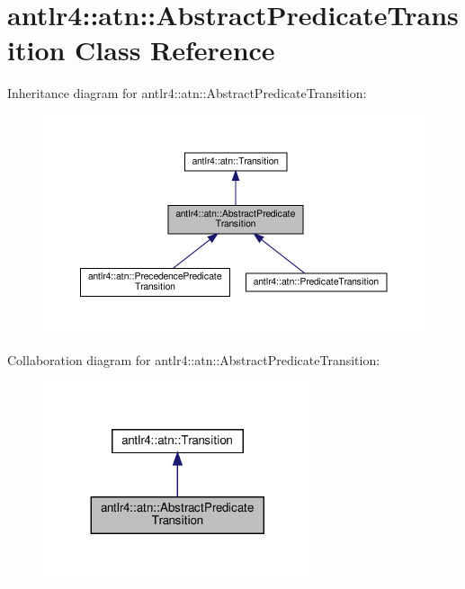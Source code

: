 \hypertarget{classantlr4_1_1atn_1_1AbstractPredicateTransition}{}\section{antlr4\+:\+:atn\+:\+:Abstract\+Predicate\+Transition Class Reference}
\label{classantlr4_1_1atn_1_1AbstractPredicateTransition}


Inheritance diagram for antlr4\+:\+:atn\+:\+:Abstract\+Predicate\+Transition\+:
\nopagebreak
\begin{figure}[H]
\begin{center}
\leavevmode
\includegraphics[width=350pt]{classantlr4_1_1atn_1_1AbstractPredicateTransition__inherit__graph}
\end{center}
\end{figure}


Collaboration diagram for antlr4\+:\+:atn\+:\+:Abstract\+Predicate\+Transition\+:
\nopagebreak
\begin{figure}[H]
\begin{center}
\leavevmode
\includegraphics[width=224pt]{classantlr4_1_1atn_1_1AbstractPredicateTransition__coll__graph}
\end{center}
\end{figure}
